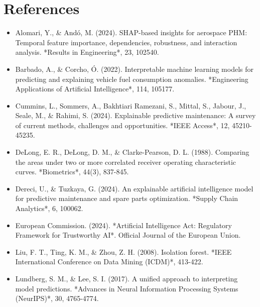 \documentclass[10pt,a4paper,journal]{article}
\begin{document}
\section{References}
\begin{itemize}
\item Alomari, Y., \& Andó, M. (2024). SHAP-based insights for aerospace PHM: Temporal feature importance, dependencies, robustness, and interaction analysis. *Results in Engineering*, 23, 102540.
\end{itemize}
\begin{itemize}
\item Barbado, A., \& Corcho, Ó. (2022). Interpretable machine learning models for predicting and explaining vehicle fuel consumption anomalies. *Engineering Applications of Artificial Intelligence*, 114, 105177.
\end{itemize}
\begin{itemize}
\item Cummins, L., Sommers, A., Bakhtiari Ramezani, S., Mittal, S., Jabour, J., Seale, M., \& Rahimi, S. (2024). Explainable predictive maintenance: A survey of current methods, challenges and opportunities. *IEEE Access*, 12, 45210-45235.
\end{itemize}
\begin{itemize}
\item DeLong, E. R., DeLong, D. M., \& Clarke-Pearson, D. L. (1988). Comparing the areas under two or more correlated receiver operating characteristic curves. *Biometrics*, 44(3), 837-845.
\end{itemize}
\begin{itemize}
\item Dereci, U., \& Tuzkaya, G. (2024). An explainable artificial intelligence model for predictive maintenance and spare parts optimization. *Supply Chain Analytics*, 6, 100062.
\end{itemize}
\begin{itemize}
\item European Commission. (2024). *Artificial Intelligence Act: Regulatory Framework for Trustworthy AI*. Official Journal of the European Union.
\end{itemize}
\begin{itemize}
\item Liu, F. T., Ting, K. M., \& Zhou, Z. H. (2008). Isolation forest. *IEEE International Conference on Data Mining (ICDM)*, 413-422.
\end{itemize}
\begin{itemize}
\item Lundberg, S. M., \& Lee, S. I. (2017). A unified approach to interpreting model predictions. *Advances in Neural Information Processing Systems (NeurIPS)*, 30, 4765-4774.
\end{itemize}
\end{document}
